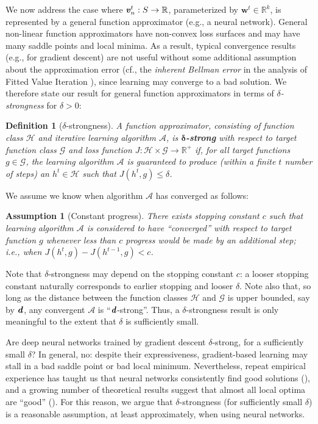 \documentclass{article}
\newcommand{\R}{\mathbb{R}}
\renewcommand{\vec}[1]{\textbf{\textit{#1}}}
\newcommand{\val}{\vec{v}}
\newcommand{\valt}{\val}
\newcommand{\params}{\textbf{w}}
\newtheorem{assumption}{Assumption}
\newtheorem{definition}{Definition}
\begin{document}
We now address the case where $\valt_n^t: S \to \R$, parameterized by $\params^t \in \R^k$, is represented by a general function approximator (e.g., a neural network). General non-linear function approximators have non-convex loss surfaces and may have many saddle points and local minima. As a result, typical convergence results (e.g., for gradient descent) are not useful without some additional assumption about the approximation error (cf., the \textit{inherent Bellman error} in the analysis of Fitted Value Iteration \cite{munos2008finite}), since learning may converge to a bad solution. We therefore state our result for general function approximators in terms of \textit{$\delta$-strongness} for $\delta > 0$:

\begin{definition}[$\delta$-strongness]\label{defition_delta_strongness}
	A function approximator, consisting of function class $\mathcal{H}$ and iterative learning algorithm $\mathcal{A}$, is \textbf{$\bm{\delta}$-strong} with respect to target function class $\mathcal{G}$ and loss function $J: \mathcal{H} \times \mathcal{G} \to \R^+$ if, for all target functions $g \in \mathcal{G}$, the learning algorithm $\mathcal{A}$ is \textit{guaranteed} to produce (within a finite $t$ number of steps) an $h^t \in \mathcal{H}$ such that $J(h^t, g) \leq \delta$.
\end{definition}

We assume we know when algorithm $\mathcal{A}$ has converged as follows:

\begin{assumption}[Constant progress]\label{assumption_minimum_progress}
	There exists stopping constant $c$ such that learning algorithm $\mathcal{A}$ is considered to have ``converged'' with respect to target function $g$ whenever less than $c$ progress would be made by an additional step; i.e., when $J(h^t, g) - J(h^{t-1}, g) < c$.
\end{assumption}

Note that $\delta$-strongness may depend on the stopping constant $c$: a looser stopping constant naturally corresponds to earlier stopping and looser $\delta$. Note also that, so long as the distance between the function classes $\mathcal{H}$ and $\mathcal{G}$ is upper bounded, say by $\vec{d}$, any convergent $\mathcal{A}$ is ``$\vec{d}$-strong''. Thus, a $\delta$-strongness result is only meaningful to the extent that $\delta$ is sufficiently small.

Are deep neural networks trained by gradient descent $\delta$-strong, for a sufficiently small $\delta$? In general, no: despite their expressiveness, gradient-based learning may stall in a bad saddle point or bad local minimum. Nevertheless, repeat empirical experience has taught us that neural networks consistently find good solutions (\cite{zhang2016understanding}), and a growing number of theoretical results suggest that almost all local optima are ``good'' (\cite{pascanu2014saddle, choromanska2015loss, pennington2017geometry}). For this reason, we argue that $\delta$-strongness (for sufficiently small $\delta$) is a reasonable assumption, at least approximately, when using neural networks.
\end{document}
